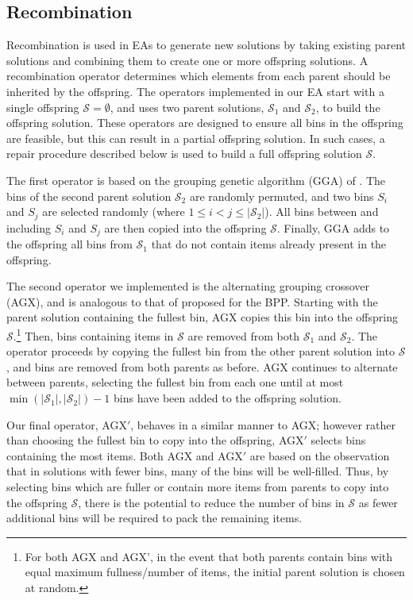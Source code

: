 \documentclass[authoryear]{elsarticle}
\begin{document}
\subsection{Recombination}
\label{sub:recomb}
\noindent Recombination is used in EAs to generate new solutions by taking existing parent solutions and combining them to create one or more offspring solutions. A recombination operator determines which elements from each parent should be inherited by the offspring. The operators implemented in our EA start with a single offspring $\mathcal{S} = \emptyset$, and uses two parent solutions, $\mathcal{S}_1$ and $\mathcal{S}_2$, to build the offspring solution. These operators are designed to ensure all bins in the offspring are feasible, but this can result in a partial offspring solution. In such cases, a repair procedure described below is used to build a full offspring solution $\mathcal{S}$.

The first operator is based on the grouping genetic algorithm (GGA) of \citet{falkenauer1992}. The bins of the second parent solution $\mathcal{S}_2$ are randomly permuted, and two bins $S_i$ and $S_j$ are selected randomly (where $1 \leq i < j \leq |\mathcal{S}_2|$). All bins between and including $S_i$ and $S_j$ are then copied into the offspring $\mathcal{S}$. Finally, GGA adds to the offspring all bins from $\mathcal{S}_1$ that do not contain items already present in the offspring.

The second operator we implemented is the alternating grouping crossover (AGX), and is analogous to that of \citet{quiroz2015} proposed for the BPP. Starting with the parent solution containing the fullest bin, AGX copies this bin into the offspring $\mathcal{S}$.\footnote{For both AGX and AGX', in the event that both parents contain bins with equal maximum fullness/number of items, the initial parent solution is chosen at random.} Then, bins containing items in $\mathcal{S}$ are removed from both $\mathcal{S}_1$ and $\mathcal{S}_2$. The operator proceeds by copying the fullest bin from the other parent solution into $\mathcal{S}$, and bins are removed from both parents as before. AGX continues to alternate between parents, selecting the fullest bin from each one until at most $\min (|\mathcal{S}_1|,|\mathcal{S}_2|) - 1$ bins have been added to the offspring solution.

Our final operator, AGX$'$, behaves in a similar manner to AGX; however rather than choosing the fullest bin to copy into the offspring, AGX$'$ selects bins containing the most items. Both AGX and AGX$'$ are based on the observation that in solutions with fewer bins, many of the bins will be well-filled. Thus, by selecting bins which are fuller or contain more items from parents to copy into the offspring $\mathcal{S}$, there is the potential to reduce the number of bins in $\mathcal{S}$ as fewer additional bins will be required to pack the remaining items.
\end{document}

